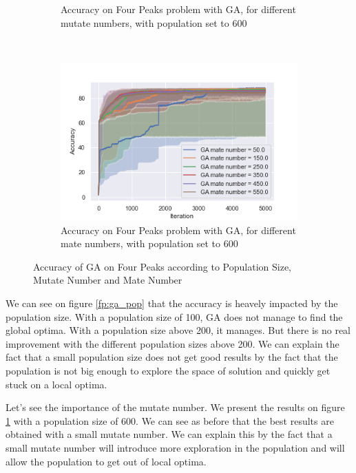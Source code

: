 \documentclass[10pt]{article}
\begin{document}
\begin{figure}[h]
\begin{subfigure}[t]{0.32\columnwidth}
						\caption{Accuracy on Four Peaks problem with GA, for different mutate numbers, with population set to 600}
						\label{fp:ga_mutate}
					\end{subfigure}
					~
					\begin{subfigure}[t]{0.32\columnwidth}
						\centering
						\includegraphics[width=\linewidth]{../graphics/four_peaks_GA_Iteration_Error_GA_mate_number.png}
						\caption{Accuracy on Four Peaks problem with GA, for different mate numbers, with population set to 600}
						\label{fp:ga_mate}
					\end{subfigure}
					\caption{Accuracy of GA on Four Peaks according to Population Size, Mutate Number and Mate Number}
					\label{fp:ga}
				\end{figure}

				We can see on figure \ref{fp:ga_pop} that the accuracy is heavely impacted by the population size. With a population size of 100, GA does not manage to find the global optima. With a population size above 200, it manages. But there is no real improvement with the different population sizes above 200. We can explain the fact that a small population size does not get good results by the fact that the population is not big enough to explore the space of solution and quickly get stuck on a local optima.

				Let's see the importance of the mutate number. We present the results on figure \ref{fp:ga_mutate} with a population size of 600. We can see as before that the best results are obtained with a small mutate number. We can explain this by the fact that a small mutate number will introduce more exploration in the population and will allow the population to get out of local optima.
\end{document}
